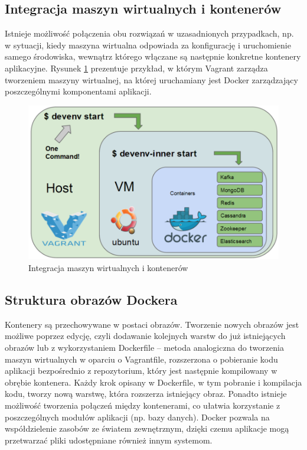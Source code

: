 \subsection{Integracja maszyn wirtualnych i kontenerów}

Istnieje możliwość połączenia obu rozwiązań w uzasadnionych przypadkach, np. w sytuacji, kiedy maszyna wirtualna odpowiada za konfigurację i uruchomienie samego środowiska, wewnątrz którego włączane są następnie konkretne kontenery aplikacyjne. Rysunek \ref{integrateVagrantDocker} prezentuje przykład, w którym Vagrant zarządza tworzeniem maszyny wirtualnej, na której uruchamiany jest Docker zarządzający poszczególnymi komponentami aplikacji.

\begin{figure}[h] \centering %
	\includegraphics[scale=0.4]{img/integratevagrantdocker.png}
	\caption{Integracja maszyn wirtualnych i kontenerów \cite{ociweb}}
	\label{integrateVagrantDocker}
\end{figure}

\subsection{Struktura obrazów Dockera}

Kontenery są przechowywane w postaci obrazów. Tworzenie nowych obrazów jest możliwe poprzez edycję, czyli dodawanie kolejnych warstw do już istniejących obrazów lub z wykorzystaniem Dockerfile – metoda analogiczna do tworzenia maszyn wirtualnych w oparciu o Vagrantfile, rozszerzona o pobieranie kodu aplikacji bezpośrednio z repozytorium, który jest następnie kompilowany w obrębie kontenera. Każdy krok opisany w Dockerfile, w tym pobranie i kompilacja kodu, tworzy nową warstwę, która rozszerza istniejący obraz. Ponadto istnieje możliwość tworzenia połączeń między kontenerami, co ułatwia korzystanie z poszczególnych modułów aplikacji (np. bazy danych). Docker pozwala na współdzielenie zasobów ze światem zewnętrznym, dzięki czemu aplikacje mogą przetwarzać pliki udostępniane również innym systemom.

